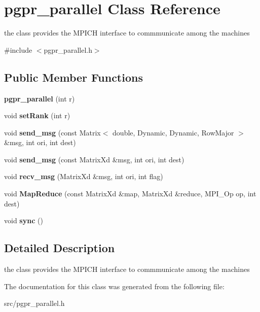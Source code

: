 \hypertarget{classpgpr__parallel}{\section{pgpr\+\_\+parallel Class Reference}
\label{classpgpr__parallel}
}


the class provides the M\+P\+I\+C\+H interface to commmunicate among the machines  




{\ttfamily \#include $<$pgpr\+\_\+parallel.\+h$>$}

\subsection*{Public Member Functions}
\begin{DoxyCompactItemize}
\item 
\hypertarget{classpgpr__parallel_a59d7312d6ce0405ce14bd5c0e7276c3d}{{\bfseries pgpr\+\_\+parallel} (int r)}\label{classpgpr__parallel_a59d7312d6ce0405ce14bd5c0e7276c3d}

\item 
\hypertarget{classpgpr__parallel_afe739849549bccc2b67a5cd6c52f8a50}{void {\bfseries set\+Rank} (int r)}\label{classpgpr__parallel_afe739849549bccc2b67a5cd6c52f8a50}

\item 
\hypertarget{classpgpr__parallel_a09094599d381034f13dfdc81bd8aac81}{void {\bfseries send\+\_\+msg} (const Matrix$<$ double, Dynamic, Dynamic, Row\+Major $>$ \&msg, int ori, int dest)}\label{classpgpr__parallel_a09094599d381034f13dfdc81bd8aac81}

\item 
\hypertarget{classpgpr__parallel_a19e0b4394bce0be9c44d2fa271ca8f63}{void {\bfseries send\+\_\+msg} (const Matrix\+Xd \&msg, int ori, int dest)}\label{classpgpr__parallel_a19e0b4394bce0be9c44d2fa271ca8f63}

\item 
\hypertarget{classpgpr__parallel_ab1340309f9b2df03effc1c4a0bc2867b}{void {\bfseries recv\+\_\+msg} (Matrix\+Xd \&msg, int ori, int flag)}\label{classpgpr__parallel_ab1340309f9b2df03effc1c4a0bc2867b}

\item 
\hypertarget{classpgpr__parallel_ac810020b3e7073b70a44b5025f32652c}{void {\bfseries Map\+Reduce} (const Matrix\+Xd \&map, Matrix\+Xd \&reduce, M\+P\+I\+\_\+\+Op op, int dest)}\label{classpgpr__parallel_ac810020b3e7073b70a44b5025f32652c}

\item 
\hypertarget{classpgpr__parallel_a6e8694a4add7f56ac4a1264070994feb}{void {\bfseries sync} ()}\label{classpgpr__parallel_a6e8694a4add7f56ac4a1264070994feb}

\end{DoxyCompactItemize}


\subsection{Detailed Description}
the class provides the M\+P\+I\+C\+H interface to commmunicate among the machines 

The documentation for this class was generated from the following file\+:\begin{DoxyCompactItemize}
\item 
src/pgpr\+\_\+parallel.\+h\end{DoxyCompactItemize}
